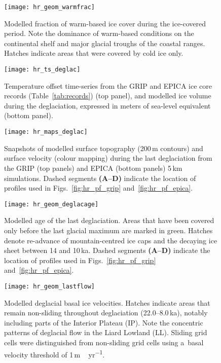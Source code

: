 \documentclass[tc, manuscript]{copernicus}
\begin{document}
\begin{figure}%
\texttt{[image: hr\_geom\_warmfrac]}
\caption{%
      Modelled fraction of warm-based ice cover during the ice-covered
      period. Note the dominance of warm-based conditions on the continental
      shelf and major glacial troughs of the coastal ranges. Hatches
      indicate areas that were covered by cold ice only.}
\label{fig:hr_geom_warmfrac}%
\end{figure}%


\begin{figure}%
\texttt{[image: hr\_ts\_deglac]}
\caption{%
      Temperature offset time-series from the GRIP and EPICA ice core
      records (Table~\ref{tab:records}) (top panel), and modelled ice volume
      during the deglaciation, expressed in meters of sea-level equivalent
      (bottom panel).}
\label{fig:hr_ts_deglac}%
\end{figure}%


\begin{figure}%
\texttt{[image: hr\_maps\_deglac]}
\caption{%
      Snapshots of modelled surface topography (200\,\unit{m} contours) and
      surface velocity (colour mapping) during the last deglaciation from
      the GRIP (top panels) and EPICA (bottom panels) 5\,\unit{km}
      simulations. Dashed segments \textbf{(A--D)} indicate the location of
      profiles used in Figs.~\ref{fig:hr_pf_grip}
      and~\ref{fig:hr_pf_epica}.}
\label{fig:hr_maps_deglac}%
\end{figure}%


\begin{figure}%
\texttt{[image: hr\_geom\_deglacage]}
\caption{%
      Modelled age of the last deglaciation. Areas that have been covered
      only before the last glacial maximum are marked in green. Hatches
      denote re-advance of mountain-centred ice caps and the decaying ice
      sheet between 14 and 10\,\unit{ka}. Dashed segments \textbf{(A--D)}
      indicate the location of profiles used in Figs.~\ref{fig:hr_pf_grip}
      and~\ref{fig:hr_pf_epica}.}
\label{fig:hr_geom_deglacage}%
\end{figure}%


\begin{figure}%
\texttt{[image: hr\_geom\_lastflow]}
\caption{%
      Modelled deglacial basal ice velocities. Hatches indicate areas that
      remain non-sliding throughout deglaciation (22.0--8.0\,\unit{ka}),
      notably including parts of the Interior Plateau (IP). Note the
      concentric patterns of deglacial flow in the Liard Lowland (LL).
      Sliding grid cells were distinguished from non-sliding grid cells
      using a~basal velocity threshold of 1\,\unit{m\,yr^{-1}}.}
\label{fig:hr_geom_lastflow}%
\end{figure}%
\end{document}
